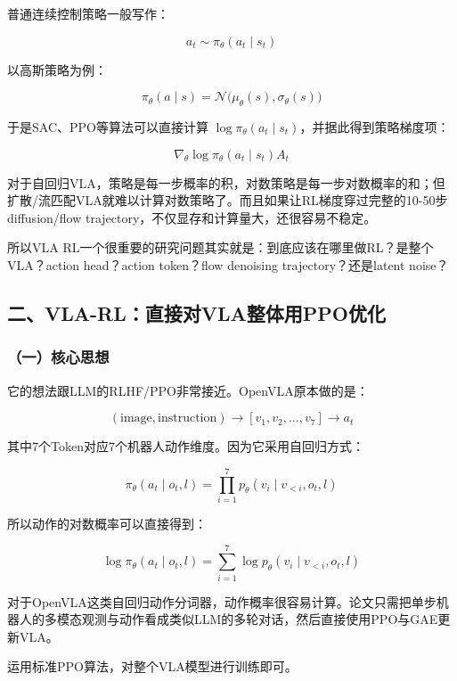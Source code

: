普通连续控制策略一般写作：

\[
a_t\sim\pi_\theta(a_t\mid s_t)
\]

以高斯策略为例：

\[
\pi_\theta(a\mid s)=\mathcal{N}\bigl(\mu_\theta(s),\sigma_\theta(s)\bigr)
\]

于是SAC、PPO等算法可以直接计算 \(\log\pi_\theta(a_t\mid s_t)\)，并据此得到策略梯度项：

\[
\nabla_\theta\log\pi_\theta(a_t\mid s_t)A_t
\]

对于自回归VLA，策略是每一步概率的积，对数策略是每一步对数概率的和；但扩散/流匹配VLA就难以计算对数策略了。而且如果让RL梯度穿过完整的10-50步diffusion/flow trajectory，不仅显存和计算量大，还很容易不稳定。

所以VLA RL一个很重要的研究问题其实就是：到底应该在哪里做RL？是整个VLA？action head？action token？flow denoising trajectory？还是latent noise？

\hypertarget{ux4e8cvla-rlux76f4ux63a5ux5bf9vlaux6574ux4f53ux7528ppoux4f18ux5316}{%
\subsection{二、VLA-RL：直接对VLA整体用PPO优化}\label{ux4e8cvla-rlux76f4ux63a5ux5bf9vlaux6574ux4f53ux7528ppoux4f18ux5316}}

\hypertarget{ux4e00ux6838ux5fc3ux601dux60f3-14}{%
\subsubsection{（一）核心思想}\label{ux4e00ux6838ux5fc3ux601dux60f3-14}}

它的想法跟LLM的RLHF/PPO非常接近。OpenVLA原本做的是：

\[
(\text{image},\text{instruction})
\longrightarrow
[v_1,v_2,\ldots,v_7]
\longrightarrow
a_t
\]

其中7个Token对应7个机器人动作维度。因为它采用自回归方式：

\[
\pi_\theta(a_t\mid o_t,l)=\prod_{i=1}^{7}p_\theta(v_i\mid v_{<i},o_t,l)
\]

所以动作的对数概率可以直接得到：

\[
\log\pi_\theta(a_t\mid o_t,l)=\sum_{i=1}^{7}\log p_\theta(v_i\mid v_{<i},o_t,l)
\]

对于OpenVLA这类自回归动作分词器，动作概率很容易计算。论文只需把单步机器人的多模态观测与动作看成类似LLM的多轮对话，然后直接使用PPO与GAE更新VLA。

运用标准PPO算法，对整个VLA模型进行训练即可。

